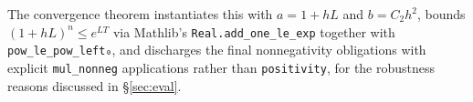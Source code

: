 \documentclass[sigplan,nonacm,screen]{acmart}
\begin{document}
The convergence theorem instantiates this with $a = 1 + hL$ and $b = C_2 h^2$,
bounds $(1+hL)^n \le e^{LT}$ via Mathlib's \lstinline[language=lean]|Real.add_one_le_exp|
together with \lstinline[language=lean]|pow_le_pow_left₀|, and discharges the final
nonnegativity obligations with explicit \lstinline[language=lean]|mul_nonneg|
applications rather than \lstinline[language=lean]|positivity|, for the
robustness reasons discussed in \S\ref{sec:eval}.
\end{document}
